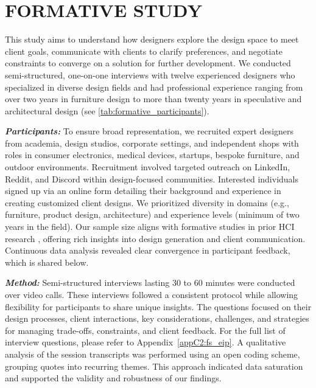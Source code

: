 \section{FORMATIVE STUDY}
This study aims to understand how designers explore the design space to meet client goals, communicate with clients to clarify preferences, and negotiate constraints to converge on a solution for further development. We conducted semi-structured, one-on-one interviews with twelve experienced designers who specialized in diverse design fields and had professional experience ranging from over two years in furniture design to more than twenty years in speculative and architectural design (see \autoref{tab:formative_participants}). 

\textbf{\textit{Participants:}} To ensure broad representation, we recruited expert designers from academia, design studios, corporate settings, and independent shops with roles in consumer electronics, medical devices, startups, bespoke furniture, and outdoor environments. Recruitment involved targeted outreach on LinkedIn, Reddit, and Discord within design-focused communities. Interested individuals signed up via an online form detailing their background and experience in creating customized client designs. We prioritized diversity in domains (e.g., furniture, product design, architecture) and experience levels (minimum of two years in the field). Our sample size aligns with formative studies in prior HCI research \cite{jeon2021fashionq, kang2021metamap, lin2024jigsaw}, offering rich insights into design generation and client communication. Continuous data analysis revealed clear convergence in participant feedback, which is shared below.

\textbf{\textit{Method:}} Semi-structured interviews lasting 30 to 60 minutes were conducted over video calls. These interviews followed a consistent protocol while allowing flexibility for participants to share unique insights. The questions focused on their design processes, client interactions, key considerations, challenges, and strategies for managing trade-offs, constraints, and client feedback. For the full list of interview questions, please refer to Appendix~\ref{appC2:fs_eip}. A qualitative analysis of the session transcripts was performed using an open coding scheme, grouping quotes into recurring themes. This approach indicated data saturation and supported the validity and robustness of our findings.

